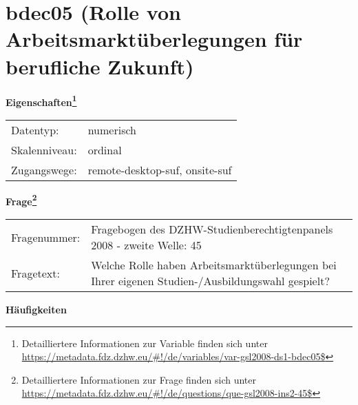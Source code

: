 
    \setcounter{footnote}{0}

    \vspace*{-1.8cm}
	\section{bdec05 (Rolle von Arbeitsmarktüberlegungen für berufliche Zukunft)}
	\label{section:bdec05}



    \vspace*{0.5cm}
    \noindent\textbf{Eigenschaften\footnote{Detailliertere Informationen zur Variable finden sich unter
		\url{https://metadata.fdz.dzhw.eu/\#!/de/variables/var-gsl2008-ds1-bdec05$}}}\\
	\begin{tabularx}{\hsize}{@{}lX}
	Datentyp: & numerisch \\
	Skalenniveau: & ordinal \\
	Zugangswege: &
	  remote-desktop-suf, 
	  onsite-suf
 \\
    \end{tabularx}



				\vspace*{0.5cm}
                \noindent\textbf{Frage\footnote{Detailliertere Informationen zur Frage finden sich unter
		              \url{https://metadata.fdz.dzhw.eu/\#!/de/questions/que-gsl2008-ins2-45$}}}\\
				\begin{tabularx}{\hsize}{@{}lX}
					Fragenummer: &
					  Fragebogen des DZHW-Studienberechtigtenpanels 2008 - zweite Welle:
					  45
 \\
					Fragetext: & Welche Rolle haben Arbeitsmarktüberlegungen bei Ihrer eigenen Studien-/Ausbildungswahl gespielt? \\
				\end{tabularx}





        		\vspace*{0.5cm}
                \noindent\textbf{Häufigkeiten}

